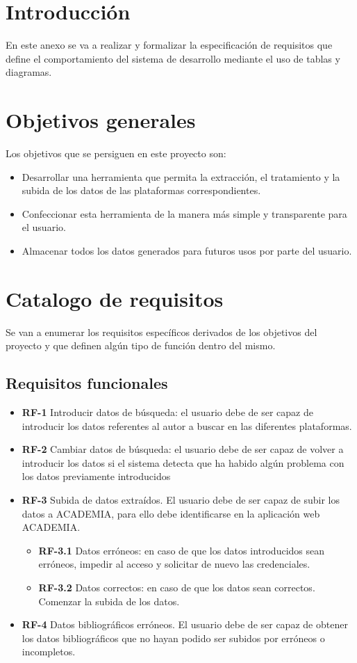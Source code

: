 
\section{Introducción}
En este anexo se va a realizar y formalizar la especificación de requisitos que define el comportamiento del sistema de desarrollo 
mediante el uso de tablas y diagramas.
\section{Objetivos generales}
Los objetivos que se persiguen en este proyecto son:
\begin{itemize}
	\item Desarrollar una herramienta que permita la extracción, el tratamiento y la subida de los datos de las plataformas correspondientes.
	\item Confeccionar esta herramienta de la manera más simple y transparente para el usuario.
	\item Almacenar todos los datos generados para futuros usos por parte del usuario.
\end{itemize}
\section{Catalogo de requisitos}
Se van a enumerar los requisitos específicos derivados de los objetivos del proyecto y que definen algún tipo de función dentro del mismo.
\subsection{Requisitos funcionales}
\begin{itemize}
	\item \textbf{RF-1} Introducir datos de búsqueda: el usuario debe de ser capaz de introducir los datos referentes al autor a buscar en las diferentes plataformas. 
	\item \textbf{RF-2} Cambiar datos de búsqueda: el usuario debe de ser capaz de volver a introducir los datos si el sistema detecta que ha habido algún problema con los datos previamente introducidos
	\item \textbf{RF-3} Subida de datos extraídos. El usuario debe de ser capaz de subir los datos a ACADEMIA, para ello debe identificarse en la aplicación web ACADEMIA.
	\begin{itemize}
		\item \textbf{RF-3.1} Datos erróneos: en caso de que los datos introducidos sean erróneos, impedir al acceso y solicitar de nuevo las credenciales.
		\item \textbf{RF-3.2} Datos correctos: en caso de que los datos sean correctos. Comenzar la subida de los datos.
	\end{itemize}
	\item \textbf{RF-4} Datos bibliográficos erróneos. El usuario debe de ser capaz de obtener los datos bibliográficos que no hayan podido ser subidos por erróneos o incompletos.
\end{itemize}
